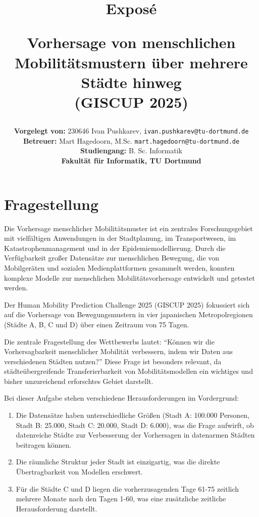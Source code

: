 \documentclass[a4paper,12pt]{article}
\title{
    \vspace{2cm}
    \Huge\textbf{Exposé}
    \vspace{1.5cm}
    
    \Large 
    Vorhersage von menschlichen Mobilitätsmustern über mehrere Städte hinweg\\
    (GISCUP 2025)
}
\author{
    \vspace{2cm}
    \textbf{Vorgelegt von:} 230646 Ivan Pushkarev, \texttt{ivan.pushkarev@tu-dortmund.de}\\
    \textbf{Betreuer:} Mart Hagedoorn, M.Sc. \texttt{mart.hagedoorn@tu-dortmund.de}\\
    \textbf{Studiengang:} B. Sc. Informatik\\
    \textbf{Fakultät für Informatik, TU Dortmund}
}
\date{}
\begin{document}
\begin{titlepage}
\maketitle
\thispagestyle{empty}
\end{titlepage}

\section{Fragestellung}

Die Vorhersage menschlicher Mobilitätsmuster ist ein zentrales Forschungsgebiet mit vielfältigen Anwendungen in der Stadtplanung, im Transportwesen, im Katastrophenmanagement und in der Epidemiemodellierung. Durch die Verfügbarkeit großer Datensätze zur menschlichen Bewegung, die von Mobilgeräten und sozialen Medienplattformen gesammelt werden, konnten komplexe Modelle zur menschlichen Mobilitätsvorhersage entwickelt und getestet werden.

Der Human Mobility Prediction Challenge 2025 (GISCUP 2025) fokussiert sich auf die Vorhersage von Bewegungsmustern in vier japanischen Metropolregionen (Städte A, B, C und D) über einen Zeitraum von 75 Tagen.

Die zentrale Fragestellung des Wettbewerbs lautet: ``Können wir die Vorhersagbarkeit menschlicher Mobilität verbessern, indem wir Daten aus verschiedenen Städten nutzen?'' Diese Frage ist besonders relevant, da städteübergreifende Transferierbarkeit von Mobilitätsmodellen ein wichtiges und bisher unzureichend erforschtes Gebiet darstellt.

Bei dieser Aufgabe stehen verschiedene Herausforderungen im Vordergrund:

\begin{enumerate}
    \item Die Datensätze haben unterschiedliche Größen (Stadt A: 100.000 Personen, Stadt B: 25.000, Stadt C: 20.000, Stadt D: 6.000), was die Frage aufwirft, ob datenreiche Städte zur Verbesserung der Vorhersagen in datenarmen Städten beitragen können.
    
    \item Die räumliche Struktur jeder Stadt ist einzigartig, was die direkte Übertragbarkeit von Modellen erschwert.
    
    \item Für die Städte C und D liegen die vorherzusagenden Tage 61-75 zeitlich mehrere Monate nach den Tagen 1-60, was eine zusätzliche zeitliche Herausforderung darstellt.
\end{enumerate}
\end{document}
